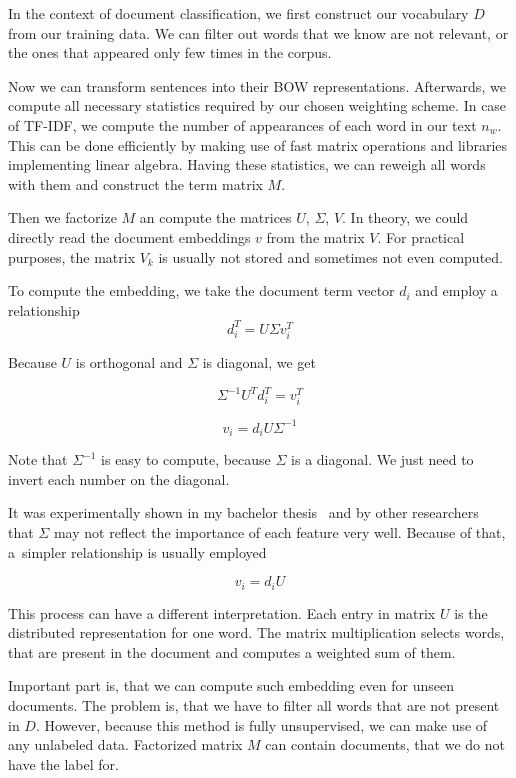     In the context of document classification, we first construct our vocabulary $D$ from our training data. 
    We can filter out words that we know are not relevant, or the ones that appeared only few times in the corpus.
    
    Now we can transform sentences into their BOW representations.
    Afterwards, we compute all necessary statistics required by our chosen weighting scheme.
    In case of TF-IDF, we compute the number of appearances of each word in our text $n_w$. 
    This can be done efficiently by making use of fast matrix operations and libraries implementing linear algebra.
    Having these statistics, we can reweigh all words with them and construct the term matrix $M$.
    
    Then we factorize $M$ an compute the matrices $U$, $\Sigma$, $V$. 
    In theory, we could directly read the document embeddings $v$ from the matrix $V$.
    For practical purposes, the matrix $V_k$ is usually not stored and sometimes not even computed. 
    
    To compute the embedding, we take the document term vector $d_i$ and employ a relationship $$d_i^T = U \Sigma v_i^T$$
    
    Because $U$ is orthogonal and $\Sigma$ is diagonal, we get
    
    $$\Sigma^{-1} U^T d_i^T = v_i^T $$

    $$v_i = d_i U \Sigma^{-1} $$
    
    Note that $\Sigma^{-1}$ is easy to compute, because $\Sigma$ is a diagonal. 
    We just need to invert each number on the diagonal.  
    
    It was experimentally shown in my bachelor thesis~\cite{macko2016} 
    and by other researchers~\cite{levy2015improving} that $\Sigma$ may not reflect the importance of each feature very well.
    Because of that, a~simpler relationship is usually employed
    
    $$v_i = d_i U $$
    
    This process can have a different interpretation.
    Each entry in matrix $U$ is the distributed representation for one word.
    The matrix multiplication selects words, that are present in the document and computes a weighted sum of them.
    
    Important part is, that we can compute such embedding even for unseen documents.
    The problem is, that we have to filter all words that are not present in $D$. 
    However, because this method is fully unsupervised, we can make use of any unlabeled data. 
    Factorized matrix $M$ can contain documents, that we do not have the label for.
    
